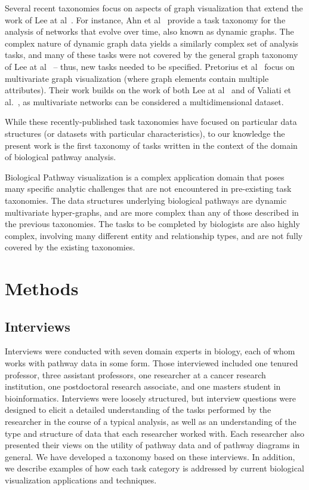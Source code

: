 \documentclass[twocolumn]{bmcart}%
\begin{document}
Several recent taxonomies focus on aspects of graph visualization that extend the work of Lee at al~\cite{Lee2006}.
For instance, Ahn et al~\cite{Ahn2014} provide a task taxonomy for the analysis of networks that evolve over time, also known as dynamic graphs.
The complex nature of dynamic graph data yields a similarly complex set of analysis tasks, and many of these tasks were not covered by the general graph taxonomy of Lee at al~\cite{Lee2006} -- thus, new tasks needed to be specified.
Pretorius et al~\cite{Pretorius2014} focus on multivariate graph visualization (where graph elements contain multiple attributes).
Their work builds on the work of both Lee at al~\cite{Lee2006} and of Valiati et al.~\cite{Valiati2006}, as multivariate networks can be considered a multidimensional dataset.

While these recently-published task taxonomies have focused on particular data structures (or datasets with particular characteristics), to our knowledge the present work is the first taxonomy of tasks written in the context of the domain of biological pathway analysis.

Biological Pathway visualization is a complex application domain that poses many specific analytic challenges that are not encountered in pre-existing task taxonomies.
The data structures underlying biological pathways are dynamic multivariate hyper-graphs, and are more complex than any of those described in the previous taxonomies.
The tasks to be completed by biologists are also highly complex, involving many different entity and relationship types, and are not fully covered by the existing taxonomies.

\section*{Methods}

\subsection*{Interviews}

Interviews were conducted with seven domain experts in biology, each of whom works with pathway data in some form.
Those interviewed included one tenured professor, three assistant professors, one researcher at a cancer research institution, one postdoctoral research associate, and one masters student in bioinformatics.
Interviews were loosely structured, but interview questions were designed to elicit a detailed understanding of the tasks performed by the researcher in the course of a typical analysis, as well as an understanding of the type and structure of data that each researcher worked with.
Each researcher also presented their views on the utility of pathway data and of pathway diagrams in general.
We have developed a taxonomy based on these interviews.
In addition, we describe examples of how each task category is addressed by current biological visualization applications and techniques.
\end{document}

